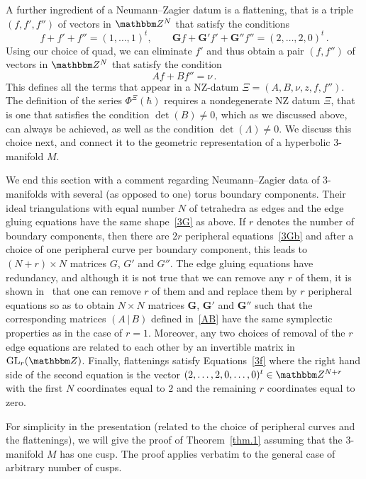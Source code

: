 \documentclass[12pt,reqno]{amsart}
\theoremstyle{definition}
\def\BZ{\mathbbm Z}
\def\be{\begin{equation}}
\def\ee{\end{equation}}
\def\GL{\mathrm{GL}}
\renewcommand{\=}{\;=\;}
\begin{document}
A further ingredient of a Neumann--Zagier datum is a flattening, that is a triple
$(f,f',f'')$ of vectors in $\BZ^N$ that satisfy the conditions
\be
\label{3f}
f + f' + f''=(1,\dots,1)^t, \qquad 
\mathbf G f + \mathbf G' f' + \mathbf G'' f'' = (2,\dots,2,0)^t \,.
\ee
Using our choice of quad, we can eliminate $f'$ and thus obtain a pair
$(f,f'')$ of vectors in $\BZ^N$ that satisfy the condition
\be
\label{2f}
A f + B f'' = \nu \,.
\ee
This defines all the terms that appear in a NZ-datum $\Xi=(A,B,\nu,z,f,f'')$. 
The definition of the series $\Phi^\Xi(\hbar)$ requires a nondegenerate NZ datum
$\Xi$, that is one that satisfies the condition $\det(B) \neq 0$, which as
we discussed above, can always be achieved, as well as the condition
$\det(\Lambda) \neq 0$. We discuss this choice next, and connect it to
the geometric representation of a hyperbolic 3-manifold $M$. 

We end this section with a comment regarding Neumann--Zagier data of 3-manifolds
with several (as opposed to one) torus boundary components. Their ideal
triangulations with equal number $N$ of tetrahedra as edges and the edge gluing
equations have the same shape~\eqref{3G} as above. If $r$ denotes the number of
boundary components, then there are $2r$ peripheral equations~\eqref{3Gb} and after
a choice of one peripheral curve per boundary component, this leads to $(N+r)\times N$
matrices $G$, $G'$ and $G''$. The edge gluing equations have redundancy, and although
it is not true that we can remove any $r$ of them, it is shown
in~\cite[Sec.4.6]{GHRS} that one can remove $r$ of them and and replace them by
$r$ peripheral equations so as to obtain $N \times N$ matrices 
$\mathbf G$, $\mathbf G'$ and $\mathbf G''$ such that the corresponding matrices
$(A \,|\,B)$ defined in~\eqref{AB} have the same symplectic properties as in the
case of $r=1$. Moreover, any two choices of removal of the $r$ edge equations are
related to each other by an invertible matrix in $\GL_r(\BZ)$. Finally, flattenings
satisfy Equations~\eqref{3f} where the right hand side of the second equation
is the vector $(2,\dots,2,0,\dots,0)^t \in \BZ^{N+r}$ with the first $N$ coordinates
equal to $2$ and the remaining $r$ coordinates equal to zero.

For simplicity in the presentation (related to the choice of peripheral curves and
the flattenings), we will give the proof of Theorem~\ref{thm.1} assuming that the
3-manifold $M$ has one cusp. The proof applies verbatim to the general case of
arbitrary number of cusps.
\end{document}
